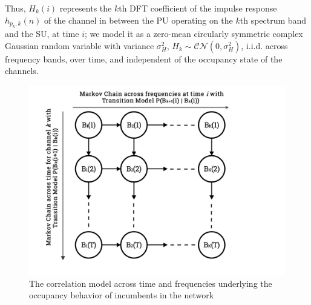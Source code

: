 \documentclass[10pt,twocolumn]{IEEEtran}
\begin{document}
Thus, $H_k(i)$ represents the $k$th DFT coefficient of the impulse response $h_{p_k,k}(n)$ of the channel in between the PU operating on the $k$th spectrum band and the SU, at time $i$; we model it as a zero-mean circularly symmetric complex Gaussian random variable with variance $\sigma_H^2$, $H_k {\sim} \mathcal{CN}(0,\sigma_H^2)$, i.i.d. across frequency bands, over time, and independent of the occupancy state of the channels.
\begin{figure}
    \centering
    \includegraphics[scale=0.083]{minerva_occupancy_markov_chain.png}
    \caption{The correlation model across time and frequencies underlying the occupancy behavior of incumbents in the network}
    \label{fig:1}
\end{figure}
\end{document}

